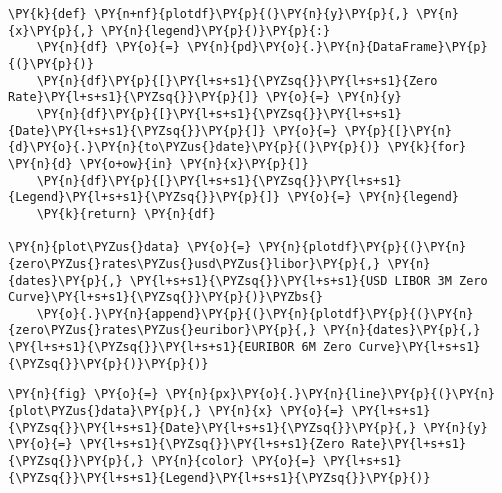     \begin{tcolorbox}[breakable, size=fbox, boxrule=1pt, pad at break*=1mm,colback=cellbackground, colframe=cellborder]
\begin{Verbatim}[commandchars=\\\{\}]
\PY{k}{def} \PY{n+nf}{plotdf}\PY{p}{(}\PY{n}{y}\PY{p}{,} \PY{n}{x}\PY{p}{,} \PY{n}{legend}\PY{p}{)}\PY{p}{:}
    \PY{n}{df} \PY{o}{=} \PY{n}{pd}\PY{o}{.}\PY{n}{DataFrame}\PY{p}{(}\PY{p}{)}
    \PY{n}{df}\PY{p}{[}\PY{l+s+s1}{\PYZsq{}}\PY{l+s+s1}{Zero Rate}\PY{l+s+s1}{\PYZsq{}}\PY{p}{]} \PY{o}{=} \PY{n}{y}
    \PY{n}{df}\PY{p}{[}\PY{l+s+s1}{\PYZsq{}}\PY{l+s+s1}{Date}\PY{l+s+s1}{\PYZsq{}}\PY{p}{]} \PY{o}{=} \PY{p}{[}\PY{n}{d}\PY{o}{.}\PY{n}{to\PYZus{}date}\PY{p}{(}\PY{p}{)} \PY{k}{for} \PY{n}{d} \PY{o+ow}{in} \PY{n}{x}\PY{p}{]}
    \PY{n}{df}\PY{p}{[}\PY{l+s+s1}{\PYZsq{}}\PY{l+s+s1}{Legend}\PY{l+s+s1}{\PYZsq{}}\PY{p}{]} \PY{o}{=} \PY{n}{legend}
    \PY{k}{return} \PY{n}{df}

\PY{n}{plot\PYZus{}data} \PY{o}{=} \PY{n}{plotdf}\PY{p}{(}\PY{n}{zero\PYZus{}rates\PYZus{}usd\PYZus{}libor}\PY{p}{,} \PY{n}{dates}\PY{p}{,} \PY{l+s+s1}{\PYZsq{}}\PY{l+s+s1}{USD LIBOR 3M Zero Curve}\PY{l+s+s1}{\PYZsq{}}\PY{p}{)}\PYZbs{}
    \PY{o}{.}\PY{n}{append}\PY{p}{(}\PY{n}{plotdf}\PY{p}{(}\PY{n}{zero\PYZus{}rates\PYZus{}euribor}\PY{p}{,} \PY{n}{dates}\PY{p}{,} \PY{l+s+s1}{\PYZsq{}}\PY{l+s+s1}{EURIBOR 6M Zero Curve}\PY{l+s+s1}{\PYZsq{}}\PY{p}{)}\PY{p}{)}
\end{Verbatim}
\end{tcolorbox}

    \begin{tcolorbox}[breakable, size=fbox, boxrule=1pt, pad at break*=1mm,colback=cellbackground, colframe=cellborder]
\begin{Verbatim}[commandchars=\\\{\}]
\PY{n}{fig} \PY{o}{=} \PY{n}{px}\PY{o}{.}\PY{n}{line}\PY{p}{(}\PY{n}{plot\PYZus{}data}\PY{p}{,} \PY{n}{x} \PY{o}{=} \PY{l+s+s1}{\PYZsq{}}\PY{l+s+s1}{Date}\PY{l+s+s1}{\PYZsq{}}\PY{p}{,} \PY{n}{y} \PY{o}{=} \PY{l+s+s1}{\PYZsq{}}\PY{l+s+s1}{Zero Rate}\PY{l+s+s1}{\PYZsq{}}\PY{p}{,} \PY{n}{color} \PY{o}{=} \PY{l+s+s1}{\PYZsq{}}\PY{l+s+s1}{Legend}\PY{l+s+s1}{\PYZsq{}}\PY{p}{)}
\end{Verbatim}
\end{tcolorbox}
 
            
            \begin{tcolorbox}[breakable, size=fbox, boxrule=.5pt, pad at break*=1mm, opacityfill=0]
    \begin{center}
    \end{center}
    { \hspace*{\fill} \\}
\end{tcolorbox}
    


